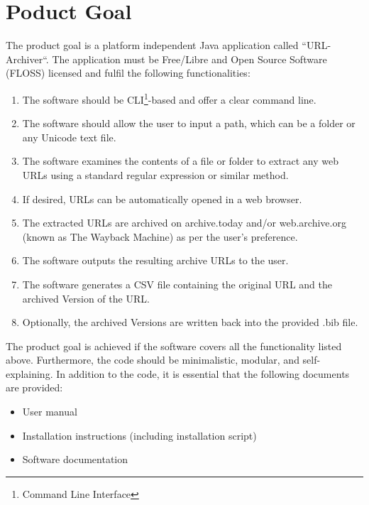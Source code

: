\section{Poduct Goal}
The product goal is a platform independent Java application called ``URL-Archiver``.
The application must be Free/Libre and Open Source Software (FLOSS) licensed and fulfil the following functionalities:
\begin{enumerate}
    \item The software should be CLI\footnote{Command Line Interface}-based and offer a clear command line.
    \item The software should allow the user to input a path, which can be a folder or any Unicode text file.
    \item The software examines the contents of a file or folder to extract any web URLs using a standard regular expression or similar method.
    \item If desired, URLs can be automatically opened in a web browser.
    \item The extracted URLs are archived on archive.today and/or web.archive.org (known as The Wayback Machine) as per the user's preference.
    \item The software outputs the resulting archive URLs to the user.
    \item The software generates a CSV file containing the original URL and the archived Version of the URL.
    \item Optionally, the archived Versions are written back into the provided .bib file.
\end{enumerate}
The product goal is achieved if the software covers all the functionality listed above.
Furthermore, the code should be minimalistic, modular, and self-explaining.
In addition to the code, it is essential that the following documents are provided:
\begin{itemize}
    \item User manual
    \item Installation instructions (including installation script)
    \item Software documentation
\end{itemize}

